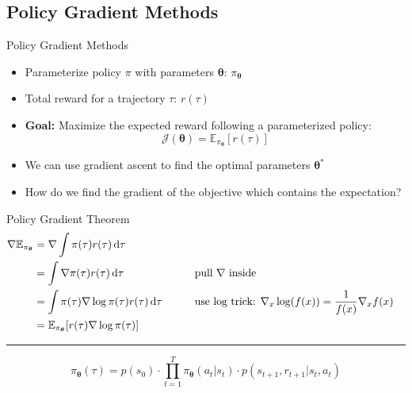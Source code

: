 \subsection{Policy Gradient Methods}


\begin{frame}{Policy Gradient Methods}{}
	\begin{itemize}
		\item Parameterize policy $\pi$ with parameters $\bm{\theta}$: $\pi_{\bm{\theta}}$
		\item Total reward for a trajectory $\tau$: $r(\tau)$
		\item \textbf{Goal:} Maximize the expected reward following a parameterized policy:
		\begin{equation}
			\mathcal{J}(\bm{\theta}) = \mathbb{E}_{\pi_{\bm{\theta}}} [r(\tau)]
		\end{equation}
		\item We can use gradient ascent to find the optimal parameters $\bm{\theta}^*$
		\item {} How do we find the gradient of the objective which contains the expectation?
	\end{itemize}
\end{frame}


\begin{frame}{Policy Gradient Theorem}{}
	\vspace*{-7mm}
	\begin{alignat*}{2}
		\nabla\mathbb{E}_{\pi_{\bm{\theta}}}
			&= \nabla\int \pi(\tau) r(\tau) \mathop{}\!\mathrm{d}\tau						\\
			&= \int \nabla\pi(\tau) r(\tau) \mathop{}\!\mathrm{d}\tau						
				&&\qquad\text{pull $\nabla$ inside} 					\\
			&= \int \pi(\tau) \nabla\log\pi(\tau) r(\tau) \mathop{}\!\mathrm{d}\tau 			
				&&\qquad\text{use log trick: $\nabla_x \log(f(x)) = \frac{1}{f(x)}\nabla_x f(x)$}
															\\
			&= \mathbb{E}_{\pi_{\bm{\theta}}} [r(\tau) \nabla\log\pi(\tau)]
	\end{alignat*}
	\vspace*{-5mm}
	\hrule
	\vspace*{1mm}
	\begin{equation*}
		\pi_{\bm{\theta}}(\tau) = p(s_0) \cdot \prod_{t=1}^T \pi_{\bm{\theta}}(a_t \vert s_t) \cdot p(s_{t+1}, r_{t+1} \vert s_t, a_t)
	\end{equation*}
\end{frame}


